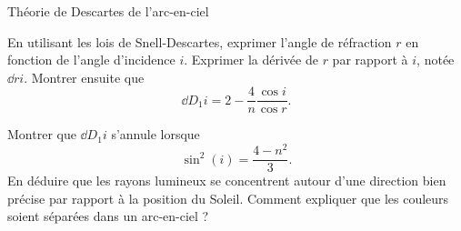 \begin{exo}[MPSI][1][colle]{Théorie de Descartes de l'arc-en-ciel}
\begin{quest}
	\item En utilisant les lois de Snell-Descartes, exprimer l'angle de réfraction $r$ en fonction de l'angle d'incidence $i$. Exprimer la dérivée de $r$ par rapport à $i$, notée $\dd{r}{i}$. Montrer ensuite que
	\begin{equation}
		\dd{D_1}{i} = 2-\frac{4}{n} \frac{\cos i}{\cos r}.
	\end{equation}



	\item Montrer que $\dd{D_1}{i}$ s’annule lorsque
	\begin{equation}
		\sin^2(i) = \frac{4-n^2}{3}.
	\end{equation}
	En déduire que les rayons lumineux se concentrent autour d’une direction bien précise par rapport à la position du Soleil. Comment expliquer que les couleurs soient séparées dans un arc-en-ciel ?
%
%
%
%

\end{quest}
\end{exo}

